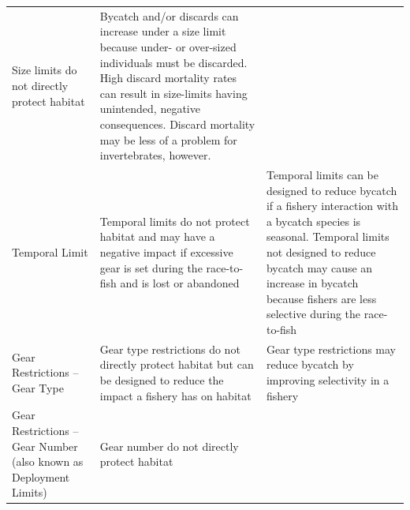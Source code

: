 \documentclass[]{book}
\begin{document}
\begin{longtable}[]{@{}lll@{}}
\begin{minipage}[t]{0.30\columnwidth}
Size limits do not directly protect habitat\strut
\end{minipage} & \begin{minipage}[t]{0.30\columnwidth}\raggedright\strut
Bycatch and/or discards can increase under a size limit because under-
or over-sized individuals must be discarded. High discard mortality
rates can result in size-limits having unintended, negative
consequences. Discard mortality may be less of a problem for
invertebrates, however.\strut
\end{minipage}\tabularnewline
\begin{minipage}[t]{0.30\columnwidth}\raggedright\strut
Temporal Limit\strut
\end{minipage} & \begin{minipage}[t]{0.30\columnwidth}\raggedright\strut
Temporal limits do not protect habitat and may have a negative impact if
excessive gear is set during the race-to-fish and is lost or
abandoned\strut
\end{minipage} & \begin{minipage}[t]{0.30\columnwidth}\raggedright\strut
Temporal limits can be designed to reduce bycatch if a fishery
interaction with a bycatch species is seasonal. Temporal limits not
designed to reduce bycatch may cause an increase in bycatch because
fishers are less selective during the race-to-fish\strut
\end{minipage}\tabularnewline
\begin{minipage}[t]{0.30\columnwidth}\raggedright\strut
Gear Restrictions -- Gear Type\strut
\end{minipage} & \begin{minipage}[t]{0.30\columnwidth}\raggedright\strut
Gear type restrictions do not directly protect habitat but can be
designed to reduce the impact a fishery has on habitat\strut
\end{minipage} & \begin{minipage}[t]{0.30\columnwidth}\raggedright\strut
Gear type restrictions may reduce bycatch by improving selectivity in a
fishery\strut
\end{minipage}\tabularnewline
\begin{minipage}[t]{0.30\columnwidth}\raggedright\strut
Gear Restrictions -- Gear Number (also known as Deployment Limits)\strut
\end{minipage} & \begin{minipage}[t]{0.30\columnwidth}\raggedright\strut
Gear number do not directly protect habitat\strut
\end{minipage} & \begin{minipage}[t]{0.30\columnwidth}\raggedright\strut

\end{minipage}
\end{longtable}
\end{document}
